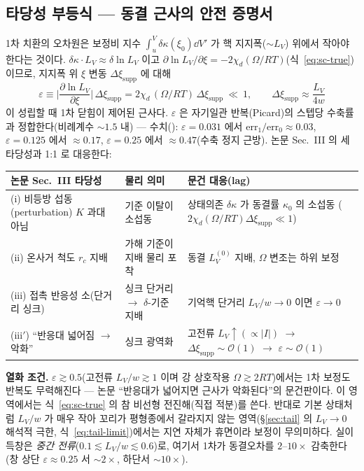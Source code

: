 \subsection{타당성 부등식 --- 동결 근사의 안전 증명서}\label{sec:sc-valid-sub}
1차 치환의 오차원은 보정비 지수 $\int_u^V\delta\kappa(\xi_0)\dd V'$ 가 핵 지지폭($\sim L_V$) 위에서 작아야 한다는 것이다.
$\delta\kappa\cdot L_V\approx\delta\ln L_V$ 이고 $\partial\ln L_V/\partial\xi=-2\chi_d(\Omega/RT)$(식~\eqref{eq:sc-true})이므로,
지지폭 위 $\xi$ 변동 $\Delta\xi_{\text{supp}}$ 에 대해
\begin{equation}
\boxed{\;\varepsilon\equiv\Big|\frac{\partial\ln L_V}{\partial\xi}\Big|\,\Delta\xi_{\text{supp}}
=2\chi_d\,(\Omega/RT)\,\Delta\xi_{\text{supp}}\ \ll\ 1,\qquad \Delta\xi_{\text{supp}}\approx\frac{L_V}{4w}\;}
\label{eq:sc-valid}
\end{equation}
이 성립할 때 1차 닫힘이 제어된 근사다. $\varepsilon$ 은 자기일관 반복(Picard)의 스텝당 수축률과 정합한다(비례계수
$\sim1.5$ 내) --- 수치(): $\varepsilon=0.031$ 에서 $\mathrm{err}_1/\mathrm{err}_0\approx0.03$,
$\varepsilon=0.125$ 에서 $\approx0.17$, $\varepsilon=0.25$ 에서 $\approx0.47$(수축 정지 근방). 논문 Sec.~III 의 세 타당성과 1:1 로 대응한다:
\begin{center}
\renewcommand{\arraystretch}{1.25}
\begin{tabular}{@{}p{}p{}p{}@{}}
\toprule
논문 Sec.~III 타당성 & 물리 의미 & 문건 대응(lag) \\
\midrule
(i) 비등방 섭동(perturbation) $K$ 과대 아님 & 기준 이탈이 소섭동 & 상태의존 $\delta\kappa$ 가 동결률 $\kappa_0$ 의 소섭동 ($2\chi_d(\Omega/RT)\Delta\xi_{\text{supp}}\ll1$) \\
(ii) 온사거 척도 $r_c$ 지배 & 가해 기준이 지배 물리 포착 & 동결 $L_V^{(0)}$ 지배, $\Omega$ 변조는 하위 보정 \\
(iii) 접촉 반응성 소(단거리 싱크) & 싱크 단거리 $\to$ $\delta$-기준 지배 & 기억핵 단거리 $L_V/w\to0$ 이면 $\varepsilon\to0$ \\
(iii$'$) ``반응대 넓어짐 $\to$ 악화'' & 싱크 광역화 & 고전류 $L_V\!\uparrow(\propto|I|)$ $\to$ $\Delta\xi_{\text{supp}}\!\sim\!\mathcal O(1)$ $\to$ $\varepsilon\!\sim\!\mathcal O(1)$ \\
\bottomrule
\end{tabular}
\end{center}

\begin{warnbox}
\textbf{열화 조건.} $\varepsilon\gtrsim0.5$(고전류 $L_V/w\gtrsim1$ 이며 강 상호작용 $\Omega\gtrsim2RT$)에서는 1차 보정도
반복도 무력해진다 --- 논문 ``반응대가 넓어지면 근사가 악화된다''의 문건판이다. 이 영역에서는 식~\eqref{eq:sc-true} 의
참 비선형 전진해(직접 적분)를 쓴다. 반대로 기본 상태처럼 $L_V/w$ 가 매우 작아 꼬리가 평형종에서 갈라지지 않는
영역(\S\ref{sec:tail} 의 $L_V\!\to\!0$ 해석적 극한, 식~\eqref{eq:tail-limit})에서는 지연 자체가 휴면이라 보정이 무의미하다.
실이득창은 \emph{중간 전류}($0.1\lesssim L_V/w\lesssim0.6$)로, 여기서 1차가 동결오차를 $2$--$10\times$ 감축한다
(창 상단 $\varepsilon\!\approx\!0.25$ 서 $\sim\!2\times$, 하단서 $\sim\!10\times$).
\end{warnbox}

